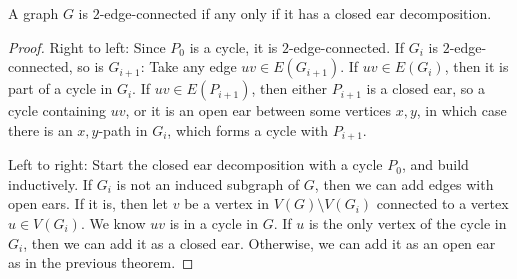 \begin{theorem}
  A graph $G$ is $2$-edge-connected if any only if it has a closed ear decomposition.
\end{theorem}

\begin{proof}
  Right to left:
  Since $P_0$ is a cycle, it is $2$-edge-connected.
  If $G_i$ is $2$-edge-connected, so is $G_{i+1}$:
  Take any edge $uv \in E(G_{i+1})$.
  If $uv \in E(G_i)$, then it is part of a cycle in $G_i$.
  If $uv \in E(P_{i+1})$, then either $P_{i+1}$ is a closed ear, so a cycle
  containing $uv$, or it is an open ear between some vertices $x,y$, in which
  case there is an $x,y$-path in $G_i$, which forms a cycle with $P_{i+1}$.

  Left to right:
  Start the closed ear decomposition with a cycle $P_0$, and build inductively.
  If $G_i$ is not an induced subgraph of $G$, then we can add edges with open
  ears.
  If it is, then let $v$ be a vertex in $V(G) \setminus V(G_i)$ connected to a
  vertex $u \in V(G_i)$.
  We know $uv$ is in a cycle in $G$.
  If $u$ is the only vertex of the cycle in $G_i$, then we can add it as a
  closed ear.
  Otherwise, we can add it as an open ear as in the previous theorem.
\end{proof}

